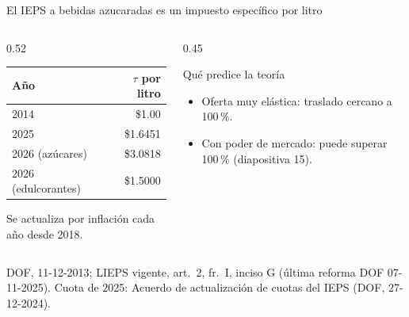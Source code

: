 \documentclass[aspectratio=169,11pt]{beamer}
\newcommand{\fuente}[1]{\par\vfill{\small\color{cGris}#1\par}}
\begin{document}
\begin{frame}{El IEPS a bebidas azucaradas es un impuesto específico por litro}
  \begin{columns}[T]
    \begin{column}{0.52\textwidth}
      \centering
      \begin{tabular}{lr}
        \toprule
        Año & $\tau$ por litro\\
        \midrule
        2014 & \$1.00\\
        2025 & \$1.6451\\
        2026 (azúcares) & \$3.0818\\
        2026 (edulcorantes) & \$1.5000\\
        \bottomrule
      \end{tabular}
      \par\medskip
      {\small Se actualiza por inflación cada año desde 2018.}
    \end{column}
    \begin{column}{0.45\textwidth}
      \pause
      \begin{block}{Qué predice la teoría}
        \begin{itemize}
          \item Oferta muy elástica: traslado cercano a 100\,\%.
          \item Con poder de mercado: puede superar 100\,\% (diapositiva 15).
        \end{itemize}
      \end{block}
    \end{column}
  \end{columns}
  \fuente{DOF, 11-12-2013; LIEPS vigente, art.~2, fr.~I, inciso G (última reforma DOF 07-11-2025). Cuota de 2025: Acuerdo de actualización de cuotas del IEPS (DOF, 27-12-2024).}
\end{frame}
\end{document}
